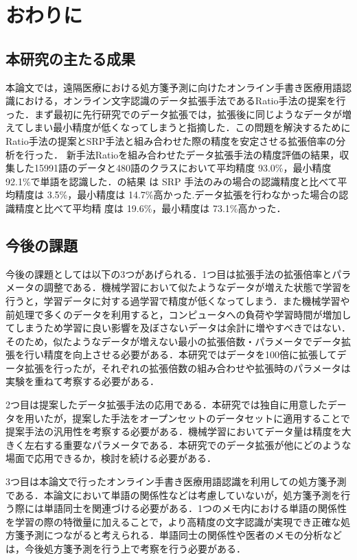 
\chapter{おわりに}
\label{cha:conclu}

\section{本研究の主たる成果}
\label{sec:main-result}

本論文では，遠隔医療における処方箋予測に向けたオンライン手書き医療用語認識における，オンライン文字認識のデータ拡張手法であるRatio手法の提案を行った．まず最初に先行研究でのデータ拡張では，拡張後に同じようなデータが増えてしまい最小精度が低くなってしまうと指摘した．この問題を解決するためにRatio手法の提案とSRP手法と組み合わせた際の精度を安定させる拡張倍率の分析を行った．
新手法Ratioを組み合わせたデータ拡張手法の精度評価の結果，収集した15991語のデータと480語のクラスにおいて平均精度 93.0\%，最小精度 92.1\%で単語を認識した．の結果 は SRP 手法のみの場合の認識精度と比べて平均精度は 3.5\%，最小精度は 14.7\%高かった.データ拡張を行わなかった場合の認識精度と比べて平均精 度は 19.6\%，最小精度は 73.1\%高かった．
\section{今後の課題}
\label{sec:future}
今後の課題としては以下の3つがあげられる．1つ目は拡張手法の拡張倍率とパラメータの調整である．機械学習において似たようなデータが増えた状態で学習を行うと，学習データに対する過学習で精度が低くなってしまう．また機械学習や前処理で多くのデータを利用すると，コンピュータへの負荷や学習時間が増加してしまうため学習に良い影響を及ぼさないデータは余計に増やすべきではない．そのため，似たようなデータが増えない最小の拡張倍数・パラメータでデータ拡張を行い精度を向上させる必要がある．本研究ではデータを100倍に拡張してデータ拡張を行ったが，それぞれの拡張倍数の組み合わせや拡張時のパラメータは実験を重ねて考察する必要がある．

2つ目は提案したデータ拡張手法の応用である．本研究では独自に用意したデータを用いたが，提案した手法をオープンセットのデータセットに適用することで提案手法の汎用性を考察する必要がある．機械学習においてデータ量は精度を大きく左右する重要なパラメータである．本研究でのデータ拡張が他にどのような場面で応用できるか，検討を続ける必要がある．

3つ目は本論文で行ったオンライン手書き医療用語認識を利用しての処方箋予測である．本論文において単語の関係性などは考慮していないが，処方箋予測を行う際には単語同士を関連づける必要がある．1つのメモ内における単語の関係性を学習の際の特徴量に加えることで，より高精度の文字認識が実現でき正確な処方箋予測につながると考えられる．単語同士の関係性や医者のメモの分析などは，今後処方箋予測を行う上で考察を行う必要がある．
